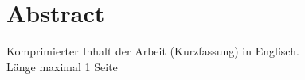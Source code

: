 
\chapter{Abstract}

Komprimierter Inhalt der Arbeit (Kurzfassung) in Englisch.\\
Länge maximal 1 Seite

\autocite[S.24]{ederer2024}

